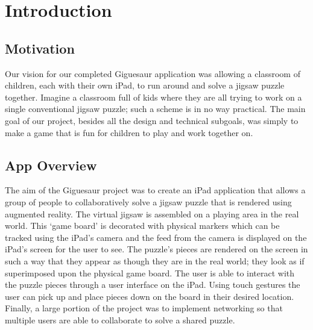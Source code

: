 \documentclass{article}
\begin{document}
\section{Introduction}


\subsection{Motivation}

Our vision for our completed Giguesaur application was allowing a classroom of children, each with their own iPad, to run around and solve a jigsaw puzzle together. Imagine a classroom full of kids where they are all trying to work on a single conventional jigsaw puzzle; such a scheme is in no way practical. The main goal of our project, besides all the design and technical subgoals, was simply to make a game that is fun for children to play and work together on. 

\subsection{App Overview}

The aim of the Giguesaur project was to create an iPad application that allows a group of people to collaboratively solve a jigsaw puzzle that is rendered using augmented reality. The virtual jigsaw is assembled on a playing area in the real world. This `game board' is decorated with physical markers which can be tracked using the iPad's camera and the feed from the camera is displayed on the iPad's screen for the user to see. The puzzle's pieces are rendered on the screen in such a way that they appear as though they are in the real world; they look as if superimposed upon the physical game board. The user is able to interact with the puzzle pieces through a user interface on the iPad. Using touch gestures the user can pick up and place pieces down on the board in their desired location. Finally, a large portion of the project was to implement networking so that multiple users are able to collaborate to solve a shared puzzle. %
\end{document}
